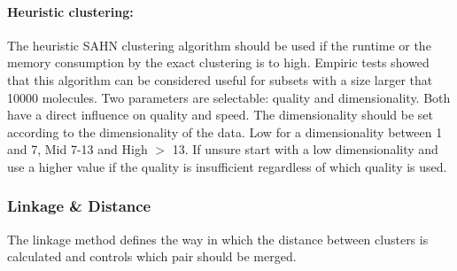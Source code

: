 
\paragraph{Heuristic clustering:} 
   The heuristic SAHN clustering algorithm should be 
   used if the runtime or the memory consumption by the exact clustering is to 
   high. Empiric tests showed that this algorithm can be considered useful for 
   subsets with a size larger that 10000 molecules. Two parameters are selectable:
   quality and dimensionality. Both have a direct influence on quality and speed.
   The dimensionality should be set according to the dimensionality of the data.
   Low for a dimensionality between 1 and 7, Mid 7-13 and High $>$ 13. If unsure
   start with a low dimensionality and use a higher value if the quality is 
   insufficient regardless of which quality is used.   


\subsubsection{Linkage \& Distance} \label{sec:scaffoldhunter:clustering:parameters}
The linkage method defines the way in which the distance between clusters is calculated and controls which pair should be merged.

